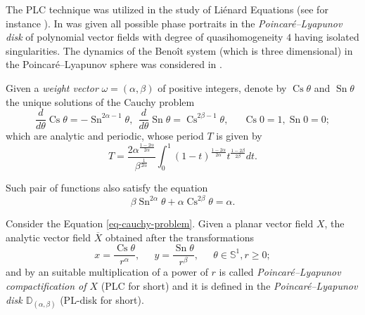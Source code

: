 \documentclass[12pt]{amsart}
\begin{document}
The PLC technique was utilized  in the study of Liénard Equations (see for instance \cite{CollDumortierProhens, Dumortier, DumortierHerssens, DumortierLi, DumortierRousseau}). In \cite{LiangHuangZhao} was given all possible phase portraits in the \emph{Poincaré--Lyapunov disk} of polynomial vector fields with degree of quasihomogeneity $4$ having isolated singularities. The dynamics of the Benoît system (which is three dimensional) in the Poincaré--Lyapunov sphere was considered in \cite{LimaLlibre}. 

Given a \emph{weight vector} $\omega = (\alpha,\beta)$ of positive integers, denote by $\operatorname{Cs}\theta$ and $\operatorname{Sn}\theta$ the unique solutions of the Cauchy problem
\begin{equation}\label{eq-cauchy-problem}
\displaystyle\frac{d}{d\theta}\operatorname{Cs}\theta = -\operatorname{Sn}^{2\alpha - 1}\theta, \  \ \displaystyle\frac{d}{d\theta}\operatorname{Sn}\theta = \operatorname{Cs}^{2\beta - 1}\theta, \ \quad \ \operatorname{Cs}0 = 1, \operatorname{Sn}0 = 0;
\end{equation}
which are analytic and periodic, whose period $T$ is given by
\begin{equation}\label{eq-period-lyapunov}
T = \displaystyle\frac{2\alpha^{\frac{1-2\alpha}{2\alpha}}}{\beta^{\frac{1}{2\alpha}}} \int_{0}^{1}(1-t)^{\frac{1-2\alpha}{2\alpha}}t^{\frac{1-2\beta}{2\beta}}dt.
\end{equation}

Such pair of functions also satisfy the equation $$\beta\operatorname{Sn}^{2\alpha}\theta + \alpha\operatorname{Cs}^{2\beta}\theta = \alpha.$$

Consider the Equation \eqref{eq-cauchy-problem}. Given a planar vector field $X$, the analytic vector field $\overline{X}$ obtained after the transformations
\begin{equation}\label{eq-cs-sn}
x = \displaystyle\frac{\operatorname{Cs}\theta}{r^{\alpha}}, \ \quad \ y = \displaystyle\frac{\operatorname{Sn}\theta}{r^{\beta}}, \ \quad \ \theta\in\mathbb{S}^{1}, r\geq 0;
\end{equation}
and by an suitable multiplication of a power of $r$ is called \emph{Poincaré--Lyapunov compactification of $X$} (PLC for short) and it is defined in the \emph{Poincaré--Lyapunov disk $\mathbb{D}_{(\alpha,\beta)}$} (PL-disk for short).
 
\end{document}
